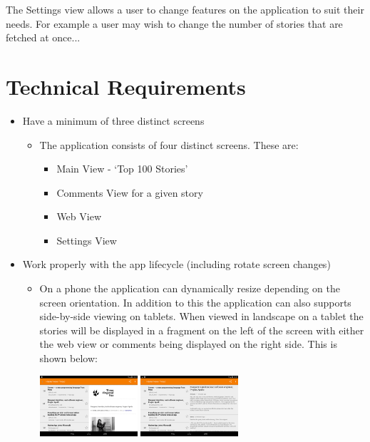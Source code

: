 \documentclass[11pt]{article}
\begin{document}
The Settings view allows a user to change features on the application to suit their needs. For example a user may wish to change the number of stories that are fetched at once...

\section*{Technical Requirements}

\begin{itemize}
	\item{Have a minimum of three distinct screens}
	\begin{itemize}
		\item{The application consists of four distinct screens. These are:}
		\begin{itemize}
			\item{Main View - ‘Top 100 Stories’}
			\item{Comments View for a given story}
			\item{Web View}
			\item{Settings View}
		\end{itemize}
		\end{itemize}
		\item{Work properly with the app lifecycle (including rotate screen changes)}
		\begin{itemize}
			\item{On a phone the application can dynamically resize depending on the screen orientation. In addition to this the application can also supports side-by-side viewing on tablets. When viewed in landscape on a tablet the stories will be displayed in a fragment on the left of the screen with either the web view or comments being displayed on the right side. This is shown below:}
			\\
			\begin{center}
				\includegraphics[width=0.3\textwidth]{tabletWeb.png}
				\includegraphics[width=0.3\textwidth]{tabletComments.png}

\end{center}
\end{itemize}
\end{itemize}
\end{document}
